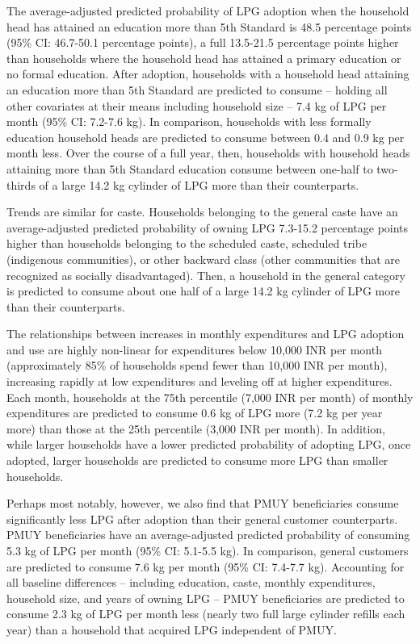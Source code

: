 \documentclass[11pt,english]{article}
\theoremstyle{plain} \newtheorem{claim}{Claim}
\theoremstyle{plain} \newtheorem{prop}{Proposition}
\theoremstyle{plain} \newtheorem{hypo}{Hypothesis}
\begin{document}
The average-adjusted predicted probability of LPG adoption when the household head has attained an education more than 5th Standard  is 48.5 percentage points (95\% CI: 46.7-50.1 percentage points), a full 13.5-21.5 percentage points higher than households where the household head has attained a primary education or no formal education. After adoption, households with a household head attaining an education more than 5th Standard are predicted to consume -- holding all other covariates at their means including household size --  7.4 kg of LPG per month (95\% CI: 7.2-7.6 kg). In comparison, households with less formally education household heads are predicted to consume between 0.4 and 0.9 kg per month less. Over the course of a full year, then, households with household heads attaining more than 5th Standard education consume between one-half to two-thirds of a large 14.2 kg cylinder of LPG more than their counterparts.

Trends are similar for caste. Households belonging to the general caste have an average-adjusted predicted probability of owning LPG  7.3-15.2 percentage points higher than households belonging to the scheduled caste, scheduled tribe (indigenous communities), or other backward class (other communities that are recognized as socially disadvantaged). Then, a household in the general category is predicted to consume about one half of a large 14.2 kg cylinder of LPG more than their counterparts.

The relationships between increases in monthly expenditures and LPG adoption and use are highly non-linear for expenditures below 10,000 INR per month (approximately 85\% of households spend fewer than 10,000 INR per month), increasing rapidly at low expenditures and leveling off at higher expenditures. Each month, households at the 75th percentile (7,000 INR per month) of monthly expenditures are predicted to consume 0.6 kg of LPG more (7.2 kg per year more) than those at the 25th percentile (3,000 INR per month). In addition, while larger households have a lower predicted probability of adopting LPG, once adopted, larger households are predicted to consume more LPG than smaller households.

Perhaps most notably, however, we also find that PMUY beneficiaries consume significantly less LPG after adoption than their general customer counterparts. PMUY beneficiaries have an average-adjusted predicted probability of consuming 5.3 kg of LPG per month (95\% CI: 5.1-5.5 kg). In comparison, general customers are predicted to consume 7.6 kg per month (95\% CI: 7.4-7.7 kg). Accounting for all baseline differences -- including education, caste, monthly expenditures, household size, and years of owning LPG -- PMUY beneficiaries are predicted to consume 2.3 kg of LPG per month less (nearly two full large cylinder refills each year) than a household that acquired LPG independent of PMUY. 
\end{document}
